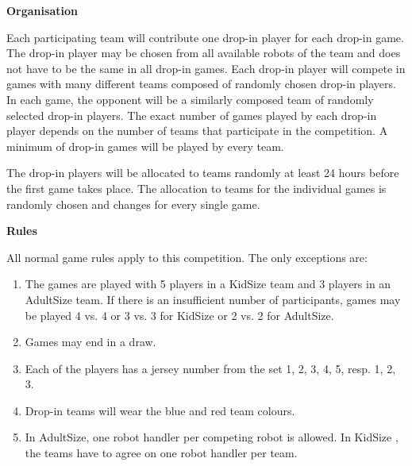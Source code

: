 \headlinebox

{\bfseries Organisation}

Each participating team will contribute one drop-in player for each drop-in game.
The drop-in player may be chosen from all available robots of the team and does
not have to be the same in all drop-in games.
Each drop-in player will compete in games with many different teams composed of
randomly chosen drop-in players.
In each game, the opponent will be a similarly composed team of randomly
selected drop-in players.
The exact number of games played by each drop-in player depends on the number of
teams that participate in the competition.
A minimum of   drop-in games will be played by every team.

\bigskip

The drop-in players will be allocated to teams randomly at least 24 hours before
the first game takes place.
The allocation to teams for the individual games is randomly chosen and changes
for every single game.

\bigskip

{\bfseries Rules}

All normal game rules apply to this competition. The only exceptions are:
\begin{enumerate}
\item The games are played with 5 players in a KidSize team
       and 3 players in an AdultSize team.
      If there is an insufficient number of participants,
      games may be played 4 vs. 4 or 3 vs. 3 for KidSize
       or 2 vs. 2 for AdultSize.
\item Games may end in a draw.
\item Each of the players has a jersey number from the set {1, 2, 3, 4, 5},
       resp. {1, 2, 3}.
\item Drop-in teams will wear the blue and red team colours.
\item In AdultSize, one robot handler per competing robot is allowed.
      In KidSize , the teams have to agree on one robot handler per team.
\end{enumerate}

